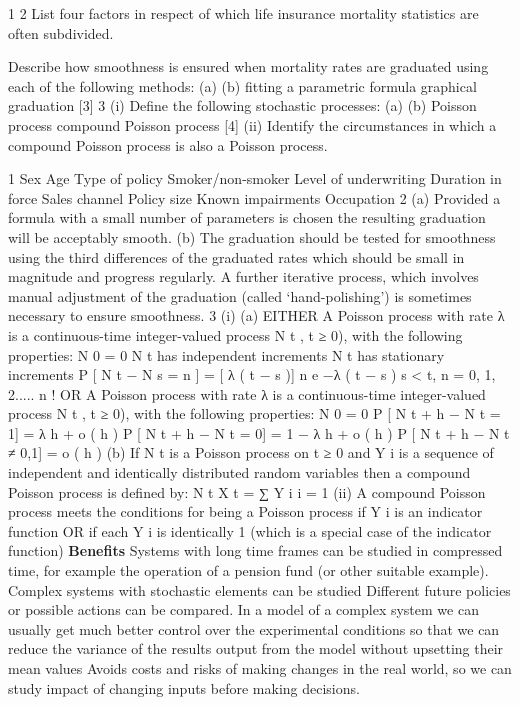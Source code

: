 \documentclass[a4paper,12pt]{article}
\begin{document}
\begin{enumerate}
1
2
List four factors in respect of which life insurance mortality statistics are often subdivided.

Describe how smoothness is ensured when mortality rates are graduated using each of the following methods:
(a)
(b)
fitting a parametric formula
graphical graduation
[3]
3
(i)
Define the following stochastic processes:
(a)
(b)
Poisson process
compound Poisson process
[4]
(ii)
Identify the circumstances in which a compound Poisson process is also a Poisson process.


1 Sex
Age
Type of policy
Smoker/non-smoker
Level of underwriting
Duration in force
Sales channel
Policy size
Known impairments
Occupation
2 (a) Provided a formula with a small number of
parameters is chosen
the resulting graduation will be acceptably smooth.
(b) The graduation should be tested for smoothness using the third differences of the graduated rates
which should be small in magnitude and progress regularly.
A further iterative process, which involves manual adjustment of the graduation (called ‘hand-polishing’) is sometimes necessary to ensure smoothness.
3
(i)
(a)
EITHER
A Poisson process with rate λ is a continuous-time
integer-valued process N t ,
t ≥ 0), with the following properties:
N 0 = 0
N t has independent increments
N t has stationary increments
P [ N t − N s = n ] =
[ λ ( t − s )] n e −λ ( t − s )
s < t, n = 0, 1, 2.....
n !
OR
A Poisson process with rate λ is a continuous-time integer-valued process N t ,
t ≥ 0), with the following properties:
N 0 = 0
P [ N t + h − N t = 1] = λ h + o ( h )
P [ N t + h − N t = 0] = 1 − λ h + o ( h )
P [ N t + h − N t ≠ 0,1] = o ( h )
(b)
If N t is a Poisson process on t ≥ 0 and Y i is a sequence of
independent and identically distributed random variables then a
compound Poisson process is defined by:
N t
X t = ∑ Y i
i = 1
(ii)
A compound Poisson process meets the conditions for being
a Poisson process if Y i is an indicator function OR if each Y i is identically
1 (which is a special case of the indicator function)
\noindent \textbf{Benefits}
Systems with long time frames can be studied in compressed time,
for example the operation of a pension fund (or other suitable example).
Complex systems with stochastic elements can be studied Different future policies or possible actions can be compared.
In a model of a complex system we can usually get much better control over the experimental conditions so that we can reduce the variance of the results output from the model without upsetting their mean values
Avoids costs and risks of making changes in the real world, so we can study impact of changing inputs before making decisions.


\end{enumerate}
\end{document}
